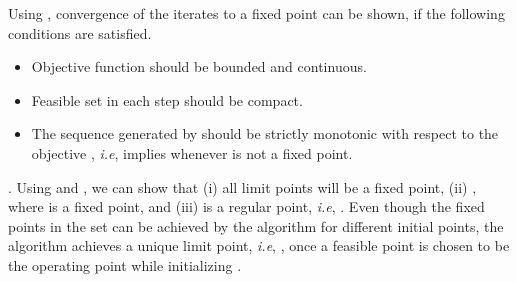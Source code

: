 Using \cite[Th. 3.1]{meyer1976sufficient}, convergence of the iterates to a fixed point can be shown, if the following conditions are satisfied.
\begin{itemize}
\item Objective function  should be bounded and continuous.
\item Feasible set  in each step should be compact.
\item The sequence  generated by  should be strictly monotonic with respect to the objective , \textit{i.e},  implies  whenever \me{\ma} is not a fixed point.
\end{itemize}
. Using \cite{zangwill1969nonlinear} and \cite[Th. 3.1]{meyer1976sufficient}, we can show that (i) all limit points will be a fixed point, (ii) , where \eqn{\ma^\ast} is a fixed point, and (iii) \eqn{\ma^\ast} is a regular point, \textit{i.e}, . Even though the fixed points in the set  can be achieved by the algorithm  for different initial points, the algorithm  achieves a unique limit point, \textit{i.e}, , once a feasible point is chosen to be the operating point while initializing .

